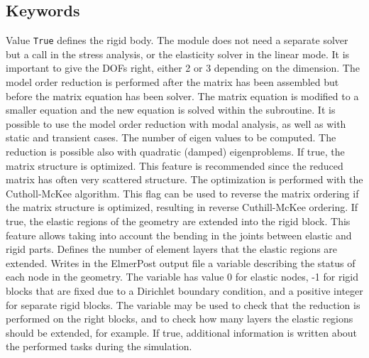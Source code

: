 \begin{versiona}
\section{Keywords}
\end{versiona}

\sifbegin
{}
\sifbegin
Value {\tt True} defines the rigid body.
\sifend
{}
The module does not need a separate solver but
a call in the stress analysis,
or the elasticity solver in the linear mode. 
\sifbegin
{}
It is important to give the DOFs right, either 2 or 3 depending on
the dimension.
The model order reduction is performed after the matrix has been assembled
but before the matrix equation has been solver. The matrix equation is 
modified to a smaller equation and the new equation is solved within the subroutine.
It is possible to use the model order reduction with modal analysis, as
well as with static and transient cases.
The number of eigen values to be computed.
The reduction is possible also with quadratic (damped) eigenproblems.
If true, the matrix structure is optimized. This feature is recommended 
since the reduced matrix has often very scattered structure. The
optimization is performed with the Cutholl-McKee algorithm.
This flag can be used to reverse the matrix ordering if the matrix
structure is optimized, resulting in reverse Cuthill-McKee ordering.
If true, the elastic regions of the geometry are extended into the rigid 
block. This feature allows taking into account the bending in the joints 
between elastic and rigid parts.
Defines the number of element layers that the elastic regions are extended.
Writes in the ElmerPost output file a variable describing the status of 
each node in the geometry. The variable has value 0 for elastic nodes,
-1 for rigid blocks that are fixed due to a Dirichlet boundary condition,
and a positive integer for separate rigid blocks. The variable may be 
used to check that the reduction is performed on the right blocks, and to
check how many layers the elastic regions should be extended, for example.
If true, additional information is written about the performed tasks
during the simulation. 
\sifend
\sifend



